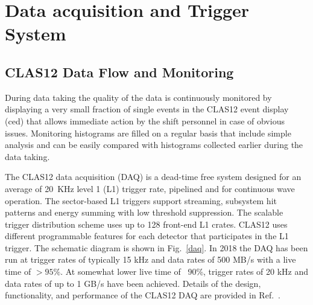 \documentclass[final,3p,twocolumn]{elsarticle}
\begin{document}



\section{Data acquisition and Trigger System} 

\subsection {\rm CLAS12 Data Flow and Monitoring} 
During data taking the quality of the data is continuously monitored by displaying a very small fraction of single events in 
 the CLAS12 event display (ced) that allows immediate action by the shift personnel in case of obvious issues. Monitoring
 histograms are filled on a regular basis that include simple analysis and can be easily compared with histograms 
 collected earlier during the data taking.  

The CLAS12 data acquisition (DAQ) is a dead-time free system designed for an average of 20~KHz level 1 (L1) 
trigger rate, pipelined and for continuous wave operation. The sector-based  L1 triggers support streaming, subsystem 
hit patterns and energy summing with low threshold suppression.  The scalable trigger distribution scheme 
uses up to 128 front-end L1 crates. CLAS12 uses different programmable features for each detector that 
participates in the L1 trigger. The schematic diagram is shown in Fig.~\ref{daq}. In 2018 the DAQ has been run 
at trigger rates of typically 15 kHz and data rates of 500 MB/s with a live time of $> 95\%$. At somewhat 
lower live time of ~90\%, trigger rates of 20 kHz and data rates of up to 1 GB/s have been achieved.
Details of the design, functionality, and performance of the CLAS12 DAQ are provided in  Ref.~\cite{DAQ}. 
 
\end{document}

